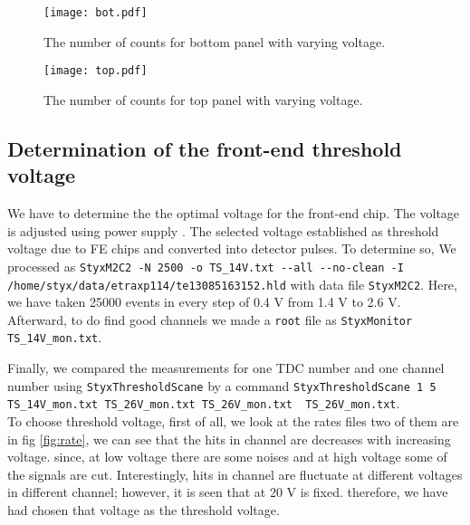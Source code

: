 \begin{figure}[H]
\begin{center}
\texttt{[image: bot.pdf]}
	\end{center}
\caption{The number of counts for bottom panel with varying voltage.}
\label{fig:PMTvoltageBot}
	\end{figure}
	
	
\begin{figure}[H]
		\begin{center}
			\texttt{[image: top.pdf]}
		\end{center}
	\caption{The number of counts for top panel with varying voltage.}%
	\label{fig:PMTvoltageTop}
\end{figure}	
	
\subsection{Determination of the front-end threshold voltage}	
We have to determine the the optimal voltage for the front-end chip. The voltage is adjusted using power supply \cite{manual}. The selected voltage established as threshold voltage due to FE chips and converted into detector pulses. To determine so, We processed as \verb|StyxM2C2 -N 2500 -o TS_14V.txt --all --no-clean -I /home/styx/data/etraxp114/te13085163152.hld| with data file \verb|StyxM2C2|. Here, we have taken \num{25000} events in every step of \num{0.4} V from \num{1.4} V to \num{2.6} V. Afterward, to do find good channels we made a \verb|root| file as \verb|StyxMonitor TS_14V_mon.txt|. 

Finally, we compared the measurements for one TDC number and one channel number using \verb|StyxThresholdScane| by a command \verb|StyxThresholdScane 1 5 TS_14V_mon.txt TS_26V_mon.txt TS_26V_mon.txt  TS_26V_mon.txt|.\\

To choose threshold voltage, first of all, we look at the rates files two of them are in fig \ref{fig:rate}, we can see that the hits in channel are decreases with increasing voltage. since, at low voltage there are some noises and at high voltage some of the signals are cut. Interestingly, hits in channel are fluctuate at different voltages in different channel; however, it is seen that at \num{20} V is fixed. therefore, we have had chosen that voltage as the threshold voltage. 

 
 
